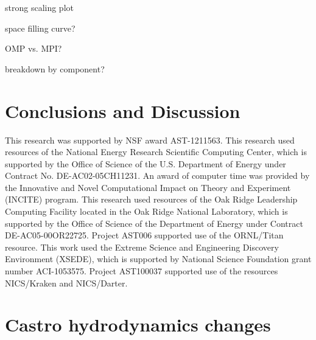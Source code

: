 \documentclass[12pt,preprint]{aastex}
\begin{document}
strong scaling plot

space filling curve?

OMP vs. MPI?

breakdown by component?


\section{Conclusions and Discussion}\label{sec:Conclusions and Discussion}


\acknowledgments

This research was supported by NSF award AST-1211563.  This research
used resources of the National Energy Research Scientific Computing
Center, which is supported by the Office of Science of the
U.S. Department of Energy under Contract No. DE-AC02-05CH11231.  An
award of computer time was provided by the Innovative and Novel
Computational Impact on Theory and Experiment (INCITE) program.  This
research used resources of the Oak Ridge Leadership Computing Facility
located in the Oak Ridge National Laboratory, which is supported by
the Office of Science of the Department of Energy under Contract
DE-AC05-00OR22725. Project AST006 supported use of the ORNL/Titan resource. This work used the Extreme Science and Engineering Discovery Environment (XSEDE), which is supported by National Science Foundation grant number ACI-1053575. Project AST100037 supported use of the resources NICS/Kraken and NICS/Darter.


\clearpage





\clearpage
\appendix

\section{Castro hydrodynamics changes}
\end{document}
